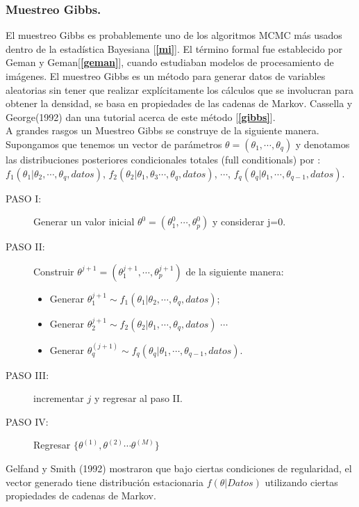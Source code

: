 \subsubsection{ Muestreo Gibbs.}
\noindent El muestreo Gibbs  es probablemente uno de los algoritmos MCMC m\'as usados dentro de la estad\'istica Bayesiana [{\bf \ref{mi}}]. El t\'ermino formal fue establecido por  Geman y Geman[{\bf \ref{geman}}], cuando estudiaban modelos de procesamiento de im\'agenes. El muestreo Gibbs es un m\'etodo para generar datos de variables aleatorias sin tener que realizar expl\'icitamente los c\'alculos que se  involucran para obtener la densidad, se basa en propiedades de las cadenas de Markov.
Cassella y George(1992) dan una tutorial acerca de este m\'etodo [{\bf \ref{gibbs}}].\\[0.12cm]
\noindent  A grandes rasgos un Muestreo Gibbs se construye de la siguiente manera.\\[0.1cm]
\noindent Supongamos que tenemos un vector de par\'ametros 
$\theta=(\theta_1,\cdots,\theta_q)$ y denotamos las distribuciones posteriores condicionales totales (full conditionals) por :\\
$f_1(\theta_1|\theta_2,\cdots,\theta_q,datos)$, 
$f_2(\theta_2|\theta_1,\theta_3\cdots,\theta_q,datos)$, 
$\cdots $, $f_q(\theta_q|\theta_1,\cdots,\theta_{q-1},datos)$.


\begin{description}
\item[PASO I:] Generar un valor inicial $\theta^{0}=(\theta_1^{0},\cdots,\theta_p^{0})$ y considerar j=0.

\item[PASO II:]
Construir $\theta^{j+1}=(\theta_1^{j+1},\cdots,\theta_p^{j+1})$ de la siguiente manera:
\begin{itemize}
 \item Generar $\theta_1^{j+1} \sim f_1(\theta_1|\theta_2,\cdots,\theta_q,datos)$;
 \item Generar $\theta_2^{j+1}\sim f_2(\theta_2|\theta_1,\cdots,\theta_q,datos)$ $\cdots$
 \item Generar $\theta_{q}^{(j+1)}\sim f_q(\theta_q|\theta_1,\cdots,\theta_{q-1},datos).$ 
\end{itemize}
\item[PASO III:] incrementar $j$ y regresar al paso II.
\item[PASO IV:] Regresar $\{\theta^{(1)},\theta^{(2)}\cdots \theta^{(M)}\}$
\end{description}

\noindent Gelfand y Smith (1992) mostraron que bajo ciertas condiciones de regularidad, el vector generado  tiene distribuci\'on estacionaria $f(\theta|Datos)$ utilizando ciertas propiedades de cadenas de Markov.

